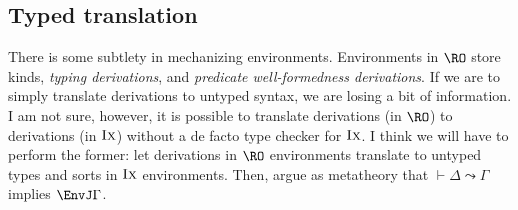 \documentclass[authoryear,acmsmall,screen]{acmart}
\newcommand\IX{\textsc{Ix}}
\begin{document}
\subsection{Typed translation}
\newcommand\Fresh{\mathrm{fresh}}
\newcommand\TransEnv[2]{\ensuremath{\vdash #1 \leadsto #2}}
\newcommand\TransTerm[4]{\ensuremath{#1 \vdash #2 \leadsto #3 : #4}}
\newcommand\TransEnt[3]{\ensuremath{\EntJ #1 #2 \leadsto #3}}
\newcommand\TransEq[3]{\ensuremath{{#1 \equiv #2} \leadsto #3}}

There is some subtlety in mechanizing environments. Environments in $\RO$ store kinds, \emph{typing derivations}, and \emph{predicate well-formedness derivations}. If we are to simply translate derivations to untyped syntax, we are losing a bit of information. I am not sure, however, it is possible to translate derivations (in $\RO$) to derivations (in $\IX$) without a de facto type checker for $\IX$. I think we will have to perform the former: let derivations in $\RO$ environments translate to untyped types and sorts in $\IX$ environments. Then, argue as metatheory that $\TransEnv \Delta \Gamma$ implies $\EnvJ \Gamma$.
\end{document}
